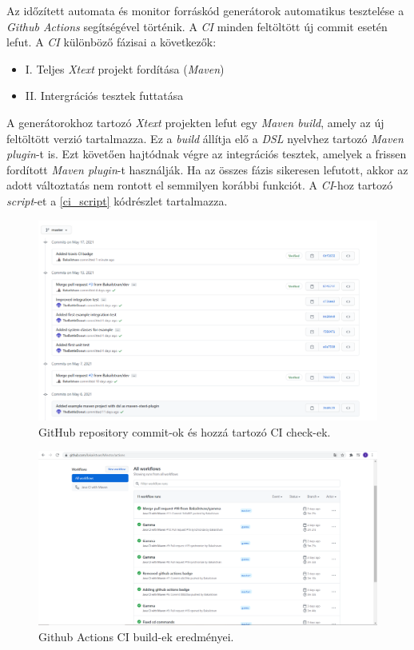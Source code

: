 Az időzített automata és monitor forráskód generátorok automatikus tesztelése a \textit{Github Actions} segítségével történik.
A \textit{CI} minden feltöltött új commit esetén lefut.
A \textit{CI} különböző fázisai a következők:

\begin{itemize}
    \item I. Teljes \textit{Xtext} projekt fordítása (\textit{Maven})
    \item II. Intergrációs tesztek futtatása
\end{itemize}

A generátorokhoz tartozó \textit{Xtext} projekten lefut egy \textit{Maven build}, amely az új feltöltött verzió tartalmazza.
Ez a \textit{build} állítja elő a \textit{DSL} nyelvhez tartozó \textit{Maven plugin}-t is.
Ezt követően hajtódnak végre az integrációs tesztek, amelyek a frissen fordított \textit{Maven plugin}-t használják.
Ha az összes fázis sikeresen lefutott, akkor az adott változtatás nem rontott el semmilyen korábbi funkciót.
A \textit{CI}-hoz tartozó \textit{script}-et a \ref{ci_script} kódrészlet tartalmazza.

\begin{figure}[!ht]
    \centering
    \includegraphics[width=150mm, keepaspectratio]{figures/github_ci_check.png}
    \caption{GitHub repository commit-ok és hozzá tartozó CI check-ek.}
\end{figure}

\begin{figure}[!ht]
    \centering
    \includegraphics[width=150mm, keepaspectratio]{figures/github_ci_builds.png}
    \caption{Github Actions CI build-ek eredményei.}
\end{figure}

